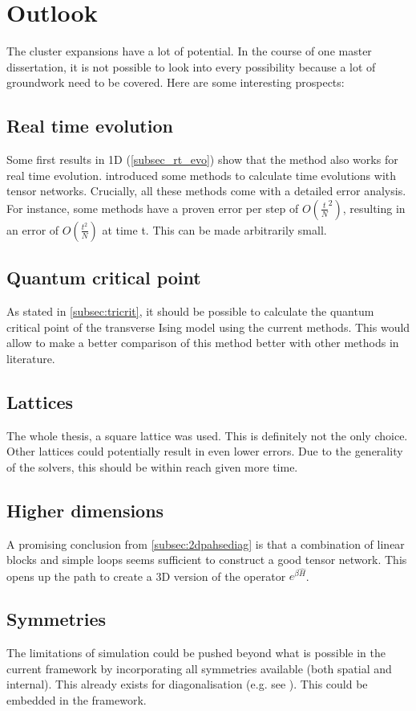 \section{Outlook}

The cluster expansions have a lot of potential. In the course of one master dissertation, it is not possible to look into every possibility because a lot of groundwork need to be covered. Here are some interesting prospects:

\subsection*{Real time evolution}

Some first results in 1D (\cref{subsec_rt_evo}) show that the method also works for real time evolution.  introduced some methods to calculate time evolutions with tensor networks. Crucially, all these methods come with a detailed error analysis. For instance, some methods have a proven error per step of $O \left( \frac{t}{N}^2  \right)$, resulting in an error of $O \left( \frac{t^2}{N}  \right)$ at time t. This can be made arbitrarily small.

\subsection*{Quantum critical point}

As stated in \cref{subsec:tricrit}, it should be possible to calculate the quantum critical point of the transverse Ising model using the current methods. This would allow to make a better comparison of this method better with other methods in literature.

\subsection*{Lattices}

The whole thesis, a square lattice was used. This is definitely not the only choice. Other lattices could potentially result in even lower errors. Due to the generality of the solvers, this should be within reach given more time.

\subsection*{Higher dimensions}

A promising conclusion from \cref{subsec:2dpahsediag} is that a combination of linear blocks and simple loops seems sufficient to construct a good tensor network. This opens up the path to create a 3D version of the operator $e^{\beta \hat{H}}$.

\subsection*{Symmetries}

The limitations of simulation could be pushed beyond what is possible in the current framework by incorporating all symmetries available (both spatial and internal). This already exists for diagonalisation (e.g. see \cite{Wietek2018}). This could be embedded in the framework.
